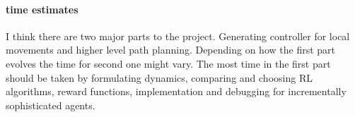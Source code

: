 \documentclass[12pt]{article}
\begin{document}
\paragraph{time estimates}
I think there are two major parts to the project.
Generating controller for local movements and higher level path planning.
Depending on how the first part evolves the time for second one might vary.
The most time in the first part should be taken by formulating dynamics, comparing and choosing RL algorithms, reward functions, implementation and debugging for incrementally sophisticated agents.



\end{document}
